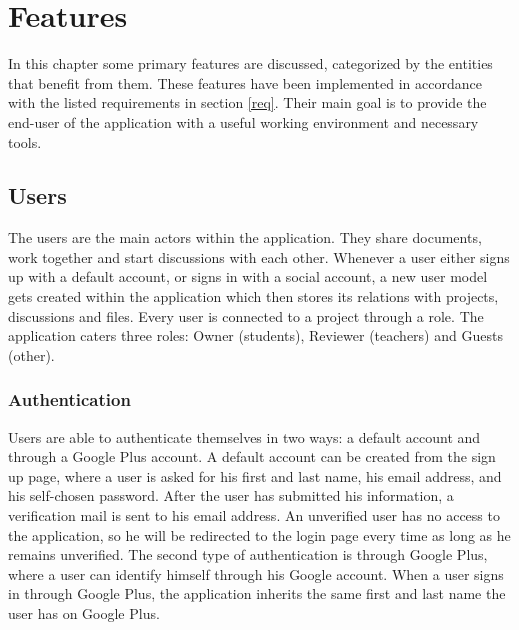 \chapter{Features}
In this chapter some primary features are discussed, categorized by the entities that benefit from them. These features have been implemented in accordance with the listed requirements in section \ref{req}. Their main goal is to provide the end-user of the application with a useful working environment and necessary tools.

\section{Users}
The users are the main actors within the application. They share documents, work together and start discussions with each other. Whenever a user either signs up with a default account, or signs in with a social account, a new user model gets created within the application which then stores its relations with projects, discussions and files. Every user is connected to a project through a role. The application caters three roles: Owner (students), Reviewer (teachers) and Guests (other).

\subsection{Authentication}
Users are able to authenticate themselves in two ways: a default account and through a Google Plus account. A default account can be created from the sign up page, where a user is asked for his first and last name, his email address, and his self-chosen password. After the user has submitted his information, a verification mail is sent to his email address. An unverified user has no access to the application, so he will be redirected to the login page every time as long as he remains unverified. The second type of authentication is through Google Plus, where a user can identify himself through his Google account. When a user signs in through Google Plus, the application inherits the same first and last name the user has on Google Plus.

